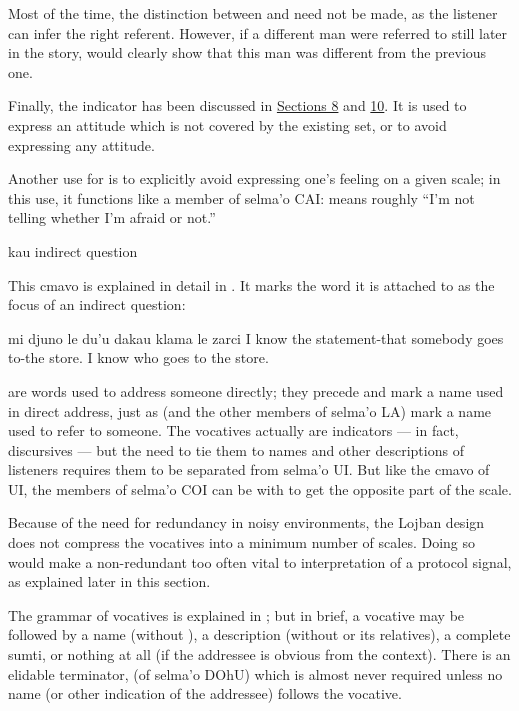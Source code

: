 Most of the time, the distinction between  and
     need not be made, as the listener can infer the
    right referent. However, if a different man were referred to
    still later in the story,  would clearly show
    that this man was different from the previous one.

Finally, the indicator  has been discussed in \hyperref[sec:13:8]{Sections 8} and \hyperref[sec:13:10]{10}. It is used
    to express an attitude which is not covered by the existing
    set, or to avoid expressing any attitude.

Another use for  is to explicitly avoid expressing
    one's feeling on a given scale; in this use, it functions like
    a member of selma'o CAI:  means roughly ``I'm not
    telling whether I'm afraid or not.''

   kau indirect question

This cmavo is explained in detail in . It marks the word it is
    attached to as the focus of an indirect question:
\begin{example}
mi djuno le du'u\n
\T	dakau klama le zarci\n
I know the statement-that\n
\T	somebody  goes to-the store.\n
I know who goes to the store.
\end{example}



 are words used to address someone directly;
    they precede and mark a name used in direct address, just as
     (and the other members of selma'o LA) mark a name used
    to refer to someone. The vocatives actually are indicators ---
    in fact, discursives --- but the need to tie them to names and
    other descriptions of listeners requires them to be separated
    from selma'o UI. But like the cmavo of UI, the members of
    selma'o COI can be  with  to get the opposite
    part of the scale.

Because of the need for redundancy in noisy environments,
    the Lojban design does not compress the vocatives into a
    minimum number of scales. Doing so would make a non-redundant
     too often vital to interpretation of a protocol signal,
    as explained later in this section.

The grammar of vocatives is explained in ; but in brief, a vocative may
    be followed by a name (without ), a description (without
     or its relatives), a complete sumti, or nothing at all
    (if the addressee is obvious from the context). There is an
    elidable terminator,  (of selma'o DOhU) which is almost
    never required unless no name (or other indication of the
    addressee) follows the vocative.

